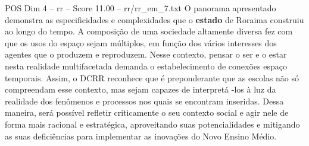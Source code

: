 \begin{textsample}{POS Dim 4 – rr – Score 11.00 – rr/rr\_em\_7.txt}
O panorama apresentado demonstra as especificidades e complexidades que o \textbf{estado} de Roraima construiu ao longo do tempo.
A composição de uma sociedade altamente diversa fez com que os usos do espaço sejam múltiplos, em função dos vários interesses dos agentes que o produzem e reproduzem.
Nesse contexto, pensar o ser e o estar nesta realidade multifacetada demanda o estabelecimento de conexões espaço temporais.
Assim, o DCRR reconhece que é preponderante que as escolas não só compreendam esse contexto, mas sejam capazes de interpretá -los à luz da realidade dos fenômenos e processos nos quais se encontram inseridas.
Dessa maneira, será possível refletir criticamente o seu contexto social e agir nele de forma mais racional e estratégica, aproveitando suas potencialidades e mitigando as suas deficiências para implementar as inovações do Novo Ensino Médio.

\end{textsample}
